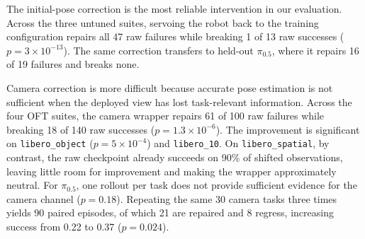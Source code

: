 \documentclass{article}
\begin{document}
\begin{table}[!t]
\centering\small
\caption{Paired correction results. ``rec.'' denotes repaired raw failures and ``broken'' denotes raw successes lost after wrapping.}
\label{tab:suites}
\end{table}

The initial-pose correction is the most reliable intervention in our evaluation. Across the three untuned suites,
servoing the robot back to the training configuration repairs all 47 raw failures while breaking 1 of 13 raw successes
($p=3\times10^{-13}$). The same correction transfers to held-out $\pi_{0.5}$, where it repairs 16 of 19 failures and
breaks none.

Camera correction is more difficult because accurate pose estimation is not sufficient when the deployed view has lost
task-relevant information. Across the four OFT suites, the camera wrapper repairs 61 of 100 raw failures while breaking
18 of 140 raw successes ($p=1.3\times10^{-6}$). The improvement is significant on
\texttt{libero\_object} ($p=5\times10^{-4}$) and \texttt{libero\_10}. On
\texttt{libero\_spatial}, by contrast, the raw checkpoint already succeeds on 90\% of shifted observations, leaving
little room for improvement and making the wrapper approximately neutral. For $\pi_{0.5}$, one rollout per task does
not provide sufficient evidence for the camera channel ($p=0.18$). Repeating the same 30 camera tasks three times yields
90 paired episodes, of which 21 are repaired and 8 regress, increasing success from 0.22 to 0.37
($p=0.024$).
\end{document}
